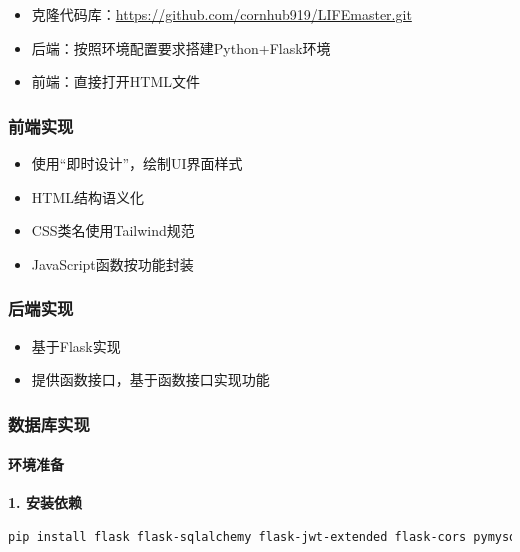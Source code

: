 \documentclass[a4paper]{article}
\begin{document}
\begin{itemize}
    \item 克隆代码库：\url{https://github.com/cornhub919/LIFEmaster.git}
    \item 后端：按照环境配置要求搭建Python+Flask环境
    \item 前端：直接打开HTML文件
\end{itemize}

\subsubsection{前端实现}

\begin{itemize}
    \item 使用``即时设计''，绘制UI界面样式
    \item HTML结构语义化
    \item CSS类名使用Tailwind规范
    \item JavaScript函数按功能封装
\end{itemize}


\subsubsection{后端实现}

\begin{itemize}
    \item 基于Flask实现
    \item 提供函数接口，基于函数接口实现功能
\end{itemize}

\subsubsection{数据库实现}

\paragraph{环境准备}

\textbf{1. 安装依赖}

\begin{lstlisting}[language=bash]
pip install flask flask-sqlalchemy flask-jwt-extended flask-cors pymysql python-dotenv
\end{lstlisting}
\end{document}
